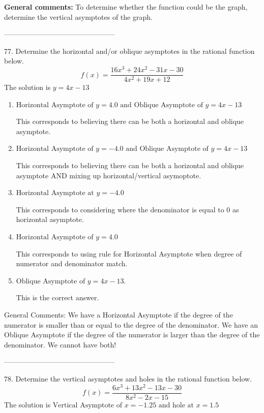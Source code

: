 \documentclass{extbook}[14pt]
\begin{document}
\textbf{General comments:} To determine whether the function could be the graph, determine the vertical asymptotes of the graph.

-----------------------------------------------

77. Determine the horizontal and/or oblique asymptotes in the rational function below.
\[ f(x) = \frac{16x^{3} +24 x^{2} -31 x -30}{4x^{2} +19 x + 12} \] 
The solution is $ y = 4x -13 $ 

\begin{enumerate}[label=\Alph*.] 
\item $ \text{Horizontal Asymptote of } y = 4.0 \text{ and Oblique Asymptote of } y = 4x -13 $ 

 This corresponds to believing there can be both a horizontal and oblique asymptote. 
\item $ \text{Horizontal Asymptote of } y = -4.0 \text{ and Oblique Asymptote of } y = 4x -13 $ 

 This corresponds to believing there can be both a horizontal and oblique asymptote AND mixing up horizontal/vertical asymoptote. 
\item $ \text{Horizontal Asymptote at } y = -4.0 $ 

 This corresponds to considering where the denominator is equal to 0 as horizontal asymptote. 
\item $ \text{Horizontal Asymptote of } y = 4.0  $ 

 This corresponds to using rule for Horizontal Asymptote when degree of numerator and denominator match. 
\item $ \text{Oblique Asymptote of } y = 4x -13. $ 

 This is the correct answer. 
\end{enumerate} 
 
General Comments: We have a Horizontal Asymptote if the degree of the numerator is smaller than or equal to the degree of the denominator. We have an Oblique Asymptote if the degree of the numerator is larger than the degree of the denominator. We cannot have both!

-----------------------------------------------

78. Determine the vertical asymptotes and holes in the rational function below.
\[ f(x) = \frac{6x^{3} +13 x^{2} -13 x -30}{8x^{2} -2 x -15} \] 
The solution is $ \text{Vertical Asymptote of } x = -1.25 \text{ and hole at } x = 1.5 $ 
\end{document}
